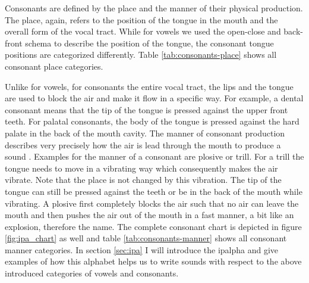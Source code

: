 Consonants are defined by the place and the manner of their physical production. The place, again, refers to the position of the tongue in the mouth and the overall form of the vocal tract. While for vowels we used the open-close and back-front schema to describe the position of the tongue, the consonant tongue positions are categorized differently. Table \ref{tab:consonants-place} shows all consonant place categories.


Unlike for vowels, for consonants the entire vocal tract, the lips and the tongue are used to block the air and make it flow in a specific way. For example, a dental consonant means that the tip of the tongue is pressed against the upper front teeth. For palatal consonants, the body of the tongue is pressed against the hard palate in the back of the mouth cavity.  
The manner of consonant production describes very precisely how the air is lead through the mouth to produce a sound \citep{phonetics-video}. Examples for the manner of a consonant are plosive or trill. For a trill the tongue needs to move in a vibrating way which consequently makes the air vibrate. Note that the place is not changed by this vibration. The tip of the tongue can still be pressed against the teeth or be in the back of the mouth while vibrating. A plosive first completely blocks the air such that no air can leave the mouth and then pushes the air out of the mouth in a fast manner, a bit like an explosion, therefore the name. The complete consonant chart is depicted in figure \ref{fig:ipa_chart} as well and table \ref{tab:consonants-manner} shows all consonant manner categories. In section \ref{sec:ipa} I will introduce the \ac{ipalpha} and give examples of how this alphabet helps us to write sounds with respect to the above introduced categories of vowels and consonants. 

